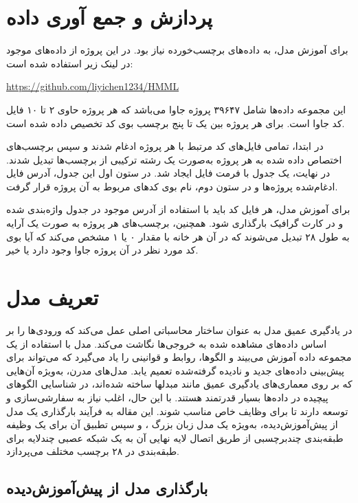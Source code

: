 \section{پردازش و جمع آوری داده}
برای آموزش مدل، به داده‌های برچسب‌خورده نیاز بود. در این پروژه از داده‌های موجود در لینک زیر استفاده شده است:
\begin{latin}
	\url{https://github.com/liyichen1234/HMML}
\end{latin}
این مجموعه داده‌ها شامل ۳۹۶۴۷ پروژه جاوا می‌باشد که هر پروژه حاوی ۲ تا ۱۰ فایل کد جاوا است. برای هر پروژه بین یک تا پنج برچسب بوی کد تخصیص داده شده است.

در ابتدا، تمامی فایل‌های کد مرتبط با هر پروژه ادغام شدند و سپس برچسب‌های اختصاص داده شده به هر پروژه به‌صورت یک رشته ترکیبی از برچسب‌ها تبدیل شدند. در نهایت، یک جدول با فرمت فایل  ایجاد شد. در ستون اول این جدول، آدرس فایل ادغام‌شده پروژه‌ها و در ستون دوم، نام بوی کدهای مربوط به آن پروژه قرار گرفت.

برای آموزش مدل، هر فایل کد باید با استفاده از آدرس موجود در جدول واژه‌بندی شده و در کارت گرافیک بارگذاری شود. همچنین، برچسب‌های هر پروژه به صورت یک آرایه به طول ۲۸ تبدیل می‌شوند که در آن هر خانه با مقدار ۰ یا ۱ مشخص می‌کند که آیا بوی کد مورد نظر در آن پروژه جاوا وجود دارد یا خیر.\cite{BOGATINOVSKI2022117215}
\section{تعریف مدل}
در یادگیری عمیق مدل به عنوان ساختار محاسباتی اصلی عمل می‌کند که ورودی‌ها را بر اساس داده‌های مشاهده شده به خروجی‌ها نگاشت می‌کند. مدل با استفاده از یک مجموعه داده آموزش می‌بیند و الگوها، روابط و قوانینی را یاد می‌گیرد که می‌تواند برای پیش‌بینی داده‌های جدید و نادیده گرفته‌شده تعمیم یابد. مدل‌های مدرن، به‌ویژه آن‌هایی که بر روی معماری‌های یادگیری عمیق مانند مبدلها ساخته شده‌اند، در شناسایی الگوهای پیچیده در داده‌ها بسیار قدرتمند هستند. با این حال، اغلب نیاز به سفارشی‌سازی و توسعه دارند تا برای وظایف خاص مناسب شوند. این مقاله به فرآیند بارگذاری یک مدل از پیش‌آموزش‌دیده، به‌ویژه یک مدل زبان بزرگ ، و سپس تطبیق آن برای یک وظیفه طبقه‌بندی چند‌برچسبی از طریق اتصال لایه نهایی آن به یک شبکه عصبی چندلایه برای طبقه‌بندی در ۲۸ برچسب مختلف می‌پردازد.\cite{Zhang2022code}
\subsection{بارگذاری مدل از پیش‌آموزش‌دیده}

